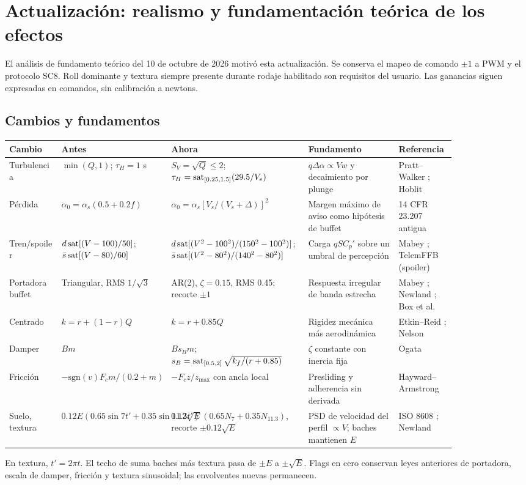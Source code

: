 \section{Actualización: realismo y fundamentación teórica de los efectos}\label{sec:realismo}
El análisis de fundamento teórico del 10 de octubre de 2026 motivó esta actualización. Se conserva el mapeo de comando $\pm1$ a PWM y el protocolo SC8. Roll dominante y textura siempre presente durante rodaje habilitado son requisitos del usuario. Las ganancias siguen expresadas en comandos, sin calibración a newtons.



\subsection{Cambios y fundamentos}
\begingroup\small
\begin{longtable}{p{0.11\linewidth}p{0.19\linewidth}p{0.24\linewidth}p{0.19\linewidth}p{0.12\linewidth}}
\toprule Cambio&Antes&Ahora&Fundamento&Referencia\\\midrule\endhead
Turbulencia&$\min(Q,1)$; $\tau_H=1$ s&$S_V=\sqrt Q\le2$; $\tau_H=\operatorname{sat}_{[0.25,1.5]}(29.5/V_e)$&$q\Delta\alpha\propto Vw$ y decaimiento por plunge&Pratt--Walker \cite{pratt1954}; Hoblit \cite{hoblit1988}\\
Pérdida&$\alpha_0=\alpha_s(0.5+0.2f)$&$\alpha_0=\alpha_s[V_s/(V_s+\Delta)]^2$&Margen máximo de aviso como hipótesis de buffet&14 CFR 23.207 antigua \cite{cfr23}\\
Tren/spoiler&$d\operatorname{sat}[(V-100)/50]$; $\bar s\operatorname{sat}[(V-80)/60]$&$d\operatorname{sat}[(V^2-100^2)/(150^2-100^2)]$; $\bar s\operatorname{sat}[(V^2-80^2)/(140^2-80^2)]$&Carga $qSC_p'$ sobre un umbral de percepción&Mabey \cite{mabey1988}; TelemFFB (spoiler) \cite{telemffb}\\
Portadora buffet&Triangular, RMS $1/\sqrt3$&AR(2), $\zeta=0.15$, RMS 0.45; recorte $\pm1$&Respuesta irregular de banda estrecha&Mabey \cite{mabey1988}; Newland \cite{newland1993}; Box et al. \cite{box}\\
Centrado&$k=r+(1-r)Q$&$k=r+0.85Q$&Rigidez mecánica más aerodinámica&Etkin--Reid \cite{etkin1996}; Nelson \cite{nelson1998}\\
Damper&$Bm$&$Bs_Bm$; $s_B=\operatorname{sat}_{[0.5,2]}\sqrt{k_f/(r+0.85)}$&$\zeta$ constante con inercia fija&Ogata \cite{ogata}\\
Fricción&$-\mathrm{sgn}(v)F_cm/(0.2+m)$&$-F_cz/z_{\max}$ con ancla local&Presliding y adherencia sin derivada&Hayward--Armstrong \cite{hayward2000}\\
Suelo, textura&$0.12E(0.65\sin7t'+0.35\sin11.3t')$&$0.12\sqrt E(0.65N_7+0.35N_{11.3})$, recorte $\pm0.12\sqrt E$&PSD de velocidad del perfil $\propto V$; baches mantienen $E$&ISO 8608 \cite{iso8608}; Newland \cite{newland1993}\\
\bottomrule\end{longtable}
\endgroup
En textura, $t'=2\pi t$. El techo de suma baches más textura pasa de $\pm E$ a $\pm\sqrt E$. Flags en cero conservan leyes anteriores de portadora, escala de damper, fricción y textura sinusoidal; las envolventes nuevas permanecen.



